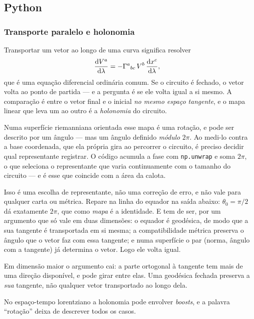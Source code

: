 \subsection{Python}


\subsubsection*{Transporte paralelo e holonomia}

Transportar um vetor ao longo de uma curva significa resolver
\begin{equation}
  \frac{\mathrm{d} V^a}{\mathrm{d} \lambda}
  = -\Gamma^a{}_{bc}\,V^b\,\frac{\mathrm{d} x^c}{\mathrm{d} \lambda},
  \label{eq:cap07-transporte}
\end{equation}
que é uma equação diferencial ordinária comum. Se o circuito é fechado, o
vetor volta ao ponto de partida --- e a pergunta é se ele volta igual a si
mesmo. A comparação é entre o vetor final e o inicial \emph{no mesmo espaço
tangente}, e o mapa linear que leva um ao outro é a \emph{holonomia} do
circuito.

\begin{atencao}[title={\sffamily\bfseries\footnotesize\color{rgTerracota}UM ÂNGULO MÓDULO $2\pi$}]
Numa superfície riemanniana orientada esse mapa é uma rotação, e pode ser
descrito por um ângulo --- mas um ângulo definido \emph{módulo} $2\pi$. Ao
medi-lo contra a base coordenada, que ela própria gira ao percorrer o
circuito, é preciso decidir qual representante registrar. O código acumula a
fase com \texttt{np.unwrap} e soma $2\pi$, o que seleciona o representante
que varia continuamente com o tamanho do circuito --- e é esse que coincide
com a área da calota.

Isso é uma escolha de representante, não uma correção de erro, e não vale
para qualquer carta ou métrica. Repare na linha do equador na saída abaixo:
$\theta_0=\pi/2$ dá exatamente $2\pi$, que como \emph{mapa} é a identidade.
E tem de ser, por um argumento que só vale em duas dimensões: o equador é
geodésica, de modo que a sua tangente é transportada em si mesma; a
compatibilidade métrica preserva o ângulo que o vetor faz com essa tangente; e
numa superfície o par (norma, ângulo com a tangente) já determina o vetor.
Logo ele volta igual.

Em dimensão maior o argumento cai: a parte ortogonal à tangente tem mais de
uma direção disponível, e pode girar entre elas. Uma geodésica fechada
preserva a \emph{sua} tangente, não qualquer vetor transportado ao longo dela.

No espaço-tempo lorentziano a holonomia pode envolver \emph{boosts}, e a
palavra ``rotação'' deixa de descrever todos os casos.
\end{atencao}

